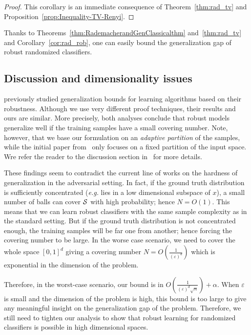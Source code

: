 \begin{proof}
This corollary is an immediate consequence of Theorem~\ref{thm:rad_tv} and Proposition~\ref{prop:Inequality-TV-Renyi}.
\end{proof}
 Thanks to Theorems~\ref{thm:RademacherandGenClassicalthm} and~\ref{thm:rad_tv} and Corollary~\ref{cor:rad_rob}, one can easily bound the generalization gap of robust randomized classifiers.

\subsection{Discussion and dimensionality issues}

\cite{xu2012robustness} previously studied generalization bounds for learning algorithms based on their robustness. 
Although we use very different proof techniques, their results and ours are similar. More precisely, both analyses conclude that robust models generalize well if the training samples have a small covering number. Note, however, that we base our formulation on an \emph{adaptive partition} of the samples, while the initial paper from~\cite{xu2012robustness} only focuses on a fixed partition of the input space. Wre refer the reader to the discussion section in~\citep{xu2012robustness} for more details. 

These findings seem to contradict the current line of works on the hardness of generalization in the adversarial setting. In fact, if the ground truth distribution is sufficiently concentrated (\emph{e.g.} lies in a low dimensional subspace of $x $), a small number of balls can cover $\mathcal{S}$ with high probability; hence $N = O(1)$. This means that we can learn robust classifiers with the same sample complexity as in the standard setting. But if the ground truth distribution is not concentrated enough, the training samples will be far one from another; hence forcing the covering number to be large. In the worse case scenario, we need to cover the whole space $[0,1]^d$ giving a covering number $N = O\left(\frac{1}{(\varepsilon)^d }\right)$ which is exponential in the dimension of the problem.

Therefore, in the worst-case scenario, our bound is in $O\left(\frac{1}{(\varepsilon)^d \sqrt{n}}\right) + \alpha$. When $\varepsilon$ is small and the dimension of the problem is high, this bound is too large to give any meaningful insight on the generalization gap of the problem.
Therefore, we still need to tighten our analysis to show that robust learning for randomized classifiers is possible in high dimensional spaces. 

